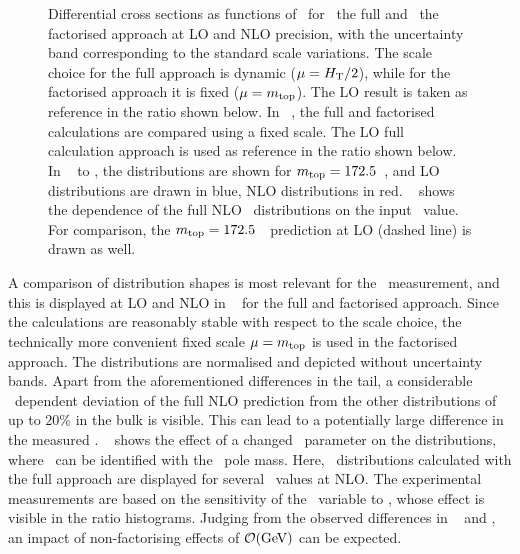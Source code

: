 \begin{figure}[tbp!]
{  \label{sfig:mlbmass}
}
\caption[\mlb\ distributions at \gls{NLO}]{
%
Differential cross sections as functions of \mlb\ for~ the full and~ the factorised approach at \gls{LO} and \gls{NLO} precision, with the uncertainty band corresponding to the standard scale variations. The scale choice for the full approach is dynamic ($\mu=H_{\mathrm{T}}/2$), while for the factorised approach it is fixed ($\mu=m_{\mathrm{top}}$). The \gls{LO} result is taken as reference in the ratio shown below. 
%
In \fig~, the full and factorised calculations are compared using a fixed scale. The \gls{LO} full calculation approach is used as reference in the ratio shown below.
%
In ~ to , the distributions are shown for $m_{\mathrm{top}}=172.5$~\GeV, and \gls{LO} distributions are drawn in blue, \gls{NLO} distributions in red. 
%
\Fig~ shows the dependence of the full \gls{NLO} \mlb\ distributions on the input \mt\ value. For comparison, the $m_{\mathrm{top}}=172.5$~\GeV\ prediction at \gls{LO} (dashed line) is drawn as well.
}
\label{fig:mlbnlo}
\end{figure}
%

A comparison of distribution shapes is most relevant for the \mt\ measurement, and this is displayed at \gls{LO} and \gls{NLO} in \fig~ for the full and factorised approach. Since the calculations are reasonably stable with respect to the scale choice, the technically more convenient fixed scale $\mu=m_{\mathrm{top}}$ is used in the factorised approach. The distributions are normalised and depicted without uncertainty bands. Apart from the aforementioned differences in the tail, a considerable \mlb\ dependent deviation of the full \gls{NLO} prediction from the other distributions of up to $20\%$ in the bulk is visible. This can lead to a potentially large difference in the measured \mt.
%
\Fig~ shows the effect of a changed \mt\ parameter on the distributions, where \mt\ can be identified with the \tquark\ pole mass. Here, \mlb\ distributions calculated with the full approach are displayed for several \mt\ values at \gls{NLO}. The experimental measurements are based on the sensitivity of the \mlb\ variable to \mt, whose effect is visible in the ratio histograms. 
%
Judging from the observed differences in ~ and , an impact of non-factorising effects of $\mathcal O(\mathrm{GeV})$ can be expected.




















